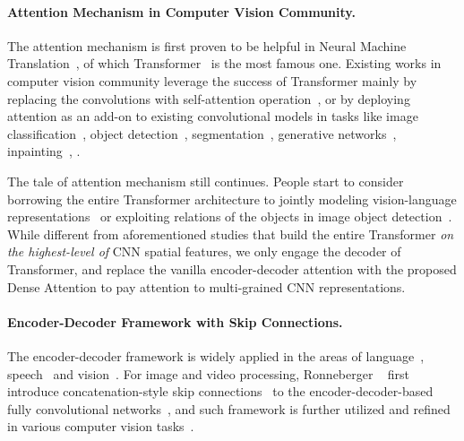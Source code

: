 \documentclass[10pt,twocolumn,letterpaper]{article}
\begin{document}
\vspace{-3.0mm}
\paragraph{Attention Mechanism in Computer Vision Community.}
The attention mechanism is first proven to be helpful in Neural Machine Translation~\cite{bahdanau2015neural,vaswani2017attention}, of which Transformer~\cite{vaswani2017attention} is the most famous one. Existing works in computer vision community leverage the success of Transformer mainly by replacing the convolutions with self-attention operation~\cite{parmar2019stand,wang2020axial}, or by deploying attention as an add-on to existing convolutional models in tasks like image classification~\cite{hu2018squeeze,hu2018gather,bello2019attention,hu2019local}, object detection~\cite{wang2018non,cao2019gcnet}, segmentation~\cite{fu2019dual,zhang2020feature}, generative networks~\cite{zhang2019self}, inpainting~\cite{zeng2020learning}, \etc.

The tale of attention mechanism still continues. People start to consider borrowing the entire Transformer architecture to jointly modeling vision-language representations~\cite{sun2019videobert,lu2019vilbert,su2019vl,rahman2020integrating,cornia2020meshed} or exploiting relations of the objects in image object detection~\cite{carion2020end,zhu2020deformable}.
While different from aforementioned studies that build the entire Transformer \emph{on the highest-level of} CNN spatial features, we only engage the decoder of Transformer, and replace the vanilla encoder-decoder attention with the proposed Dense Attention to pay attention to multi-grained CNN representations.

\vspace{-3.0mm}
\paragraph{Encoder-Decoder Framework with Skip Connections.}
The encoder-decoder framework is widely applied in the areas of language~\cite{cho2014learning,bahdanau2015neural}, speech~\cite{chan2016listen} and vision~\cite{long2015fully,zhu2017unpaired}. For image and video processing, Ronneberger \etal~\cite{ronneberger2015u} first introduce concatenation-style skip connections~\cite{he2016deep,huang2017densely} to the encoder-decoder-based fully convolutional networks~\cite{long2015fully}, and such framework is further utilized and refined in various computer vision tasks~\cite{mao2016image,fu2017dssd,tong2017image}.
\end{document}
